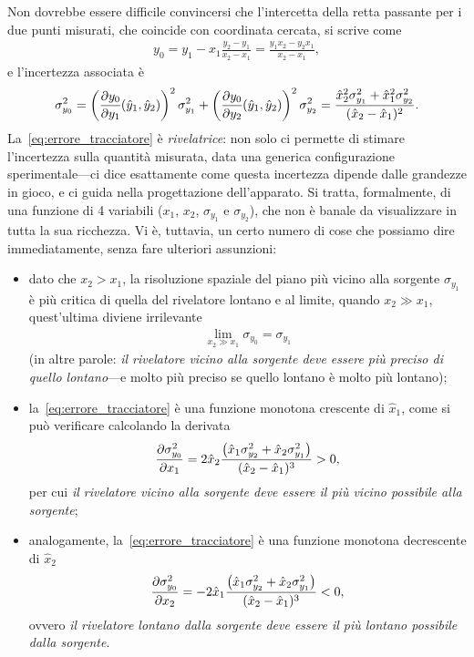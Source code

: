 Non dovrebbe essere difficile convincersi che l'intercetta della retta passante
per i due punti misurati, che coincide con coordinata cercata, si scrive come
\begin{align*}
  y_0 = y_1 - x_1 \frac{y_2 - y_1}{x_2 - x_1} = \frac{y_1x_2 - y_2x_1}{x_2 - x_1},
\end{align*}
e l'incertezza associata è
\begin{align}\label{eq:errore_tracciatore}
  \sigma^2_{y_0} = \left( \pd{y_0}{y_1}{\hat{y}_1, \hat{y}_2}\right)^2 \sigma^2_{y_1} +
  \left( \pd{y_0}{y_2}{\hat{y}_1, \hat{y}_2}\right)^2 \sigma^2_{y_2} =
  \frac{\hat{x}_2^2 \sigma^2_{y_1} + \hat{x}_1^2 \sigma^2_{y_2}}{(\hat{x}_2 - \hat{x}_1)^2}.
\end{align}
La~\eqref{eq:errore_tracciatore} è \emph{rivelatrice}: non solo ci permette
di stimare l'incertezza sulla quantità misurata, data una generica configurazione
sperimentale---ci dice esattamente come questa incertezza dipende dalle grandezze
in gioco, e ci guida nella progettazione dell'apparato. Si tratta, formalmente,
di una funzione di 4 variabili ($x_1$, $x_2$, $\sigma_{y_1}$ e $\sigma_{y_2}$),
che non è banale da visualizzare in tutta la sua ricchezza. Vi è, tuttavia,
un certo numero di cose che possiamo dire immediatamente, senza fare ulteriori assunzioni:
\begin{itemize}
  \item dato che $x_2 > x_1$, la risoluzione spaziale del piano più vicino alla
  sorgente $\sigma_{y_1}$ è più critica di quella del rivelatore lontano e
  al limite, quando $x_2 \gg x_1$, quest'ultima diviene irrilevante
  \begin{align*}
    \lim_{x_2 \gg x_1} \sigma_{y_0} = \sigma_{y_1}
  \end{align*}
  (in altre parole: \emph{il rivelatore vicino alla sorgente deve essere più preciso
  di quello lontano}---e molto più preciso se quello lontano è molto più
  lontano);
  \item la~\eqref{eq:errore_tracciatore} è una funzione monotona crescente di
  $\hat{x}_1$, come si può verificare calcolando la derivata
  \begin{align*}
    \pd{\sigma^2_{y_0}}{x_1}{} =
    2\hat{x}_2 \frac{\left( \hat{x}_1\sigma^2_{y_2} + \hat{x}_2\sigma^2_{y_1} \right)}%
    {(\hat{x}_2 - \hat{x}_1)^3} > 0,
  \end{align*}
  per cui \emph{il rivelatore vicino alla sorgente deve essere il più vicino
  possibile alla sorgente};
  \item analogamente, la~\eqref{eq:errore_tracciatore} è una funzione monotona
  decrescente di $\hat{x}_2$
  \begin{align*}
    \pd{\sigma^2_{y_0}}{x_2}{} =
    - 2\hat{x}_1 \frac{\left( \hat{x}_1\sigma^2_{y_2} + \hat{x}_2\sigma^2_{y_1} \right)}%
    {(\hat{x}_2 - \hat{x}_1)^3} < 0,
  \end{align*}
  ovvero \emph{il rivelatore lontano dalla sorgente deve essere il più lontano
  possibile dalla sorgente}.
\end{itemize}
